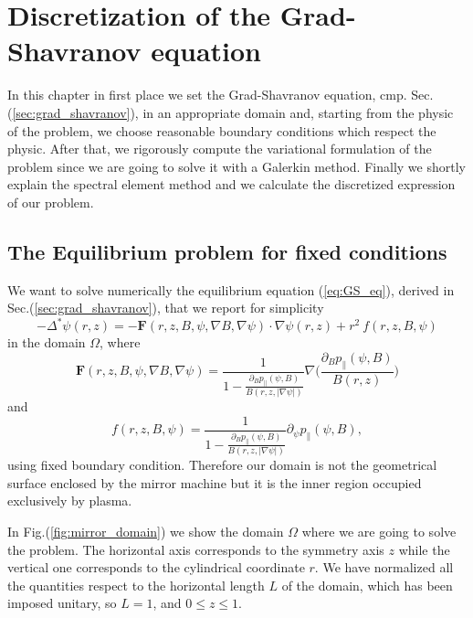 \chapter{Discretization of the Grad-Shavranov equation}\label{chapter:sem}
In this chapter in first place we set the Grad-Shavranov equation, cmp. Sec.(\ref{sec:grad_shavranov}), in an appropriate domain and, starting from the physic of the problem, we choose reasonable boundary conditions which respect the physic. After that, we rigorously compute the variational formulation of the problem since we are going to solve it with a Galerkin method. Finally we shortly explain the spectral element method and we calculate the discretized expression of our problem.

\section{The Equilibrium problem for fixed conditions}\label{sec:eq_problem_fixed_bc}
We want to solve numerically the equilibrium equation (\ref{eq:GS_eq}), derived in Sec.(\ref{sec:grad_shavranov}), that we report for simplicity
\begin{equation}\label{eq:compact_equlibrium}
  -\Delta^*\psi(r,z)=-\mathbf{F}(r,z,B,\psi,\nabla B, \nabla\psi)\cdot\nabla\psi(r,z)+r^2\:f(r,z,B,\psi)
\end{equation}
in the domain $\Omega$, where
\begin{equation}\label{eq:functional_F}
  \mathbf{F}(r,z,B,\psi,\nabla B, \nabla\psi)=\frac{1}{1-\frac{\partial_B p_\parallel(\psi,B)}{B(r,z,|\nabla\psi|)}}\nabla \Big(\frac{\partial_B p_\parallel(\psi,B)}{B(r,z)}\Big)
\end{equation}
and
\begin{equation}
  f(r,z,B,\psi)=\frac{1}{1-\frac{\partial_B p_\parallel(\psi,B)}{B(r,z,|\nabla\psi|)}}\partial_\psi p_\parallel(\psi,B),
\end{equation}
using fixed boundary condition. Therefore our domain is not the geometrical surface enclosed by the mirror machine but it is the inner region occupied exclusively by plasma.
\medskip

In Fig.(\ref{fig:mirror_domain}) we show the domain $\Omega$ where we are going to solve the problem. The horizontal axis corresponds to the symmetry axis $z$ while the vertical one corresponds to the cylindrical coordinate $r$. We have normalized all the quantities respect to the horizontal length $L$ of the domain, which has been imposed unitary, so $L=1$, and $0\leq z\leq 1$.

